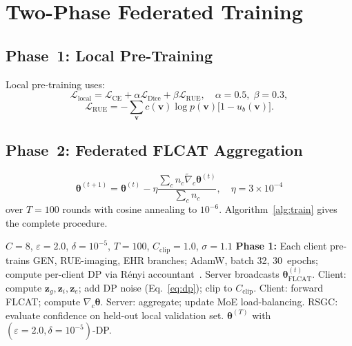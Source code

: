 \documentclass[journal,draftclsnofoot,10pt,onecolumn]{IEEEtran}
\begin{document}
\section{Two-Phase Federated Training}
\label{sec:training}

\subsection{Phase~1: Local Pre-Training}

Local pre-training uses:
\begin{equation}
\mathcal{L}_{\mathrm{local}} =
\mathcal{L}_{\mathrm{CE}} + \alpha\mathcal{L}_{\mathrm{Dice}} +
\beta\mathcal{L}_{\mathrm{RUE}},\quad\alpha\!=\!0.5,\;\beta\!=\!0.3,
\end{equation}
\begin{equation}
\mathcal{L}_{\mathrm{RUE}} =
-\sum_{\mathbf{v}} c(\mathbf{v})\log p(\mathbf{v})
\bigl[1\!-\!u_b(\mathbf{v})\bigr].
\end{equation}

\subsection{Phase~2: Federated FLCAT Aggregation}

\begin{equation}
\boldsymbol{\theta}^{(t+1)} = \boldsymbol{\theta}^{(t)} -
\eta\frac{\sum_c n_c\tilde{\nabla}_c\boldsymbol{\theta}^{(t)}}{\sum_c n_c},
\quad\eta\!=\!3\!\times\!10^{-4}
\end{equation}
over $T\!=\!100$ rounds with cosine annealing to $10^{-6}$.
Algorithm~\ref{alg:train} gives the complete procedure.

\begin{algorithm}[!t]
\caption{FMBM-Net Federated Training}
\label{alg:train}
\begin{algorithmic}[1]
\REQUIRE $C\!=\!8$, $\varepsilon\!=\!2.0$, $\delta\!=\!10^{-5}$, $T\!=\!100$,
$C_{\mathrm{clip}}\!=\!1.0$, $\sigma\!=\!1.1$
\STATE \textbf{Phase 1:} Each client pre-trains GEN, RUE-imaging, EHR branches;
       AdamW, batch 32, 30~epochs; compute per-client DP via R\'{e}nyi
       accountant~\cite{mironov2017renyi}.
  \STATE Server broadcasts $\boldsymbol{\theta}_{\mathrm{FLCAT}}^{(t)}$.
  \STATE Client: compute $\mathbf{z}_g,\mathbf{z}_i,\mathbf{z}_e$;
         add DP noise (Eq.~\ref{eq:dp}); clip to $C_{\mathrm{clip}}$.
  \STATE Client: forward FLCAT; compute $\nabla_c\boldsymbol{\theta}$.
  \STATE Server: aggregate; update MoE load-balancing.
  \STATE RSGC: evaluate confidence on held-out local validation set.
\ENDFOR
\ENSURE $\boldsymbol{\theta}^{(T)}$ with $(\varepsilon\!=\!2.0,\delta\!=\!10^{-5})$-DP.
\end{algorithmic}
\end{algorithm}
\end{document}

